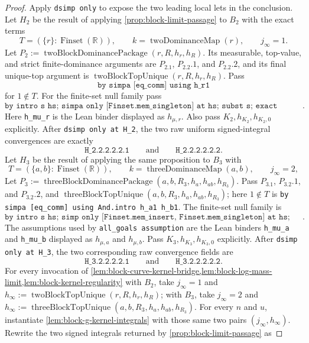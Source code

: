 \documentclass[9pt]{extarticle}
\theoremstyle{definition}
\theoremstyle{remark}
\newcommand{\R}{\mathbb R}
\begin{document}
\begin{proof}
Apply \texttt{dsimp only} to expose the two leading local lets in the
conclusion.  Let $H_2$ be the result of applying
\cref{prop:block-limit-passage} to $B_2$ with the exact terms
\[
 T=(\{r\}:\operatorname{Finset}(\R)),\qquad
 k=\operatorname{twoDominanceMap}(r),\qquad j_\infty=1.
\]
Let $P_2:=\operatorname{twoBlockDominancePackage}(r,R,h_r,h_R)$.
Its measurable, top-value, and strict finite-dominance arguments are
$P_2.1$, $P_2.2.1$, and $P_2.2.2$, and its final
unique-top argument is
$\operatorname{twoBlockTopUnique}(r,R,h_r,h_R)$.  Pass
\[
 \texttt{by simpa [eq\_comm] using h\_r1}
\]
for $1\notin T$.  For the finite-set null family pass
\[
 \texttt{by intro s hs; simpa only [Finset.mem\_singleton] at hs;
 subst s; exact h\_mu\_r}.
\]
Here \texttt{h\_mu\_r} is the Lean binder displayed as $h_{\mu,r}$.
Also pass $K_2,h_{K_2},h_{K_2,0}$ explicitly.
After \texttt{dsimp only at H\_2}, the two raw uniform signed-integral
convergences are exactly
\[
 \texttt{H\_2.2.2.2.2.1}
 \qquad\text{and}\qquad
 \texttt{H\_2.2.2.2.2.2}.
\]
Let $H_3$ be the result of applying the same proposition to $B_3$ with
\[
 T=(\{a,b\}:\operatorname{Finset}(\R)),\qquad
 k=\operatorname{threeDominanceMap}(a,b),\qquad j_\infty=2,
\]
Let $P_3:=\operatorname{threeBlockDominancePackage}
(a,b,R_3,h_a,h_{ab},h_{R_3})$.  Pass $P_3.1$, $P_3.2.1$, and $P_3.2.2$,
and
$\operatorname{threeBlockTopUnique}(a,b,R_3,h_a,h_{ab},h_{R_3})$; here
$1\notin T$ is
\texttt{by simpa [eq\_comm] using And.intro h\_a1 h\_b1}.  The finite-set
null family is
\[
 \texttt{by intro s hs; simp only [Finset.mem\_insert,
 Finset.mem\_singleton] at hs; rcases hs with rfl | rfl;
 all\_goals assumption}.
\]
The assumptions used by \texttt{all\_goals assumption} are the Lean binders
\texttt{h\_mu\_a} and \texttt{h\_mu\_b} displayed as
$h_{\mu,a}$ and $h_{\mu,b}$.
Pass $K_3,h_{K_3},h_{K_3,0}$ explicitly.
After \texttt{dsimp only at H\_3}, the two corresponding raw convergence
fields are
\[
 \texttt{H\_3.2.2.2.2.1}
 \qquad\text{and}\qquad
 \texttt{H\_3.2.2.2.2.2}.
\]
For every invocation of
\cref{lem:block-curve-kernel-bridge,lem:block-log-mass-limit,lem:block-kernel-regularity}
with $B_2$, take $j_\infty=1$ and
$h_\infty:=\operatorname{twoBlockTopUnique}(r,R,h_r,h_R)$; with $B_3$, take
$j_\infty=2$ and
$h_\infty:=\operatorname{threeBlockTopUnique}
 (a,b,R_3,h_a,h_{ab},h_{R_3})$.
For every $n$ and $u$, instantiate
\cref{lem:block-g-kernel-integrals} with those same two pairs
$(j_\infty,h_\infty)$.  Rewrite the two signed integrals returned by
\cref{prop:block-limit-passage} as

\end{proof}
\end{document}
